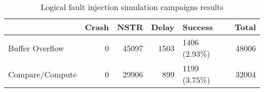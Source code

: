 \begin{table}[H]
\centering
\caption{Logical fault injection simulation campaigns results}
\label{table:end_sim_by_status_multi_bitflip_spatial}
\begin{tabular}{lrrrlr}
\toprule
 & Crash & NSTR & Delay & Success & Total \\
\midrule
Buffer Overflow & 0 & 45097 & 1503 & 1406 (2.93\%) & 48006 \\
Compare/Compute & 0 & 29906 & 899 & 1199 (3.75\%) & 32004 \\
\bottomrule
\end{tabular}
\end{table}
